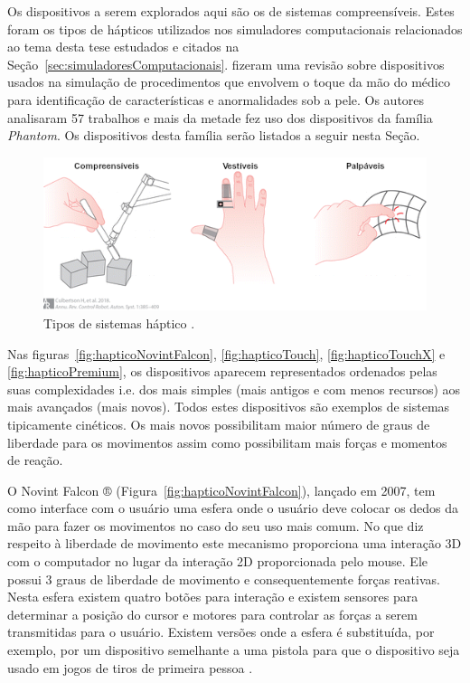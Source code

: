 Os dispositivos a serem explorados aqui são os de sistemas compreensíveis. Estes foram os tipos de hápticos utilizados nos simuladores computacionais relacionados ao tema desta tese estudados e citados na Seção~\ref{sec:simuladoresComputacionais}. \textcite{Ribeiro2016} fizeram uma revisão sobre dispositivos usados na simulação de procedimentos que envolvem o toque da mão do médico para identificação de características e anormalidades sob a pele. Os autores analisaram 57 trabalhos e mais da metade fez uso dos dispositivos da família \textit{Phantom}. Os dispositivos desta família serão listados a seguir nesta Seção.

\begin{figure}[ht!]
    \centering
    \includegraphics[width=0.8\linewidth]{capitulos/figuras/tipos.hapticos-portugues.png}
    \caption{Tipos de sistemas háptico \cite{Culbertson2018}.}
    \label{fig:tiposHapticos}
\end{figure}

Nas figuras~\ref{fig:hapticoNovintFalcon}, \ref{fig:hapticoTouch}, \ref{fig:hapticoTouchX} e  \ref{fig:hapticoPremium}, os dispositivos aparecem representados ordenados pelas suas complexidades i.e. dos mais simples (mais antigos e com menos recursos) aos mais avançados (mais novos). Todos estes dispositivos são exemplos de sistemas tipicamente cinéticos. Os mais novos possibilitam maior número de graus de liberdade para os movimentos assim como possibilitam mais forças e momentos de reação. 

O Novint Falcon ® (Figura~\ref{fig:hapticoNovintFalcon}), lançado em 2007, tem como interface com o usuário uma esfera onde o usuário deve colocar os dedos da mão para fazer os movimentos no caso do seu uso mais comum. No que diz respeito à liberdade de movimento este mecanismo proporciona uma interação 3D com o computador no lugar da interação 2D proporcionada pelo mouse. Ele possui 3 graus de liberdade de movimento e consequentemente forças reativas. Nesta esfera existem quatro botões para interação e existem sensores para determinar a posição do cursor e motores para controlar as forças a serem transmitidas para o usuário. Existem versões onde a esfera é substituída, por exemplo, por um dispositivo semelhante a uma pistola para que o dispositivo seja usado em jogos de tiros de primeira pessoa \cite{VRS2017}. 

